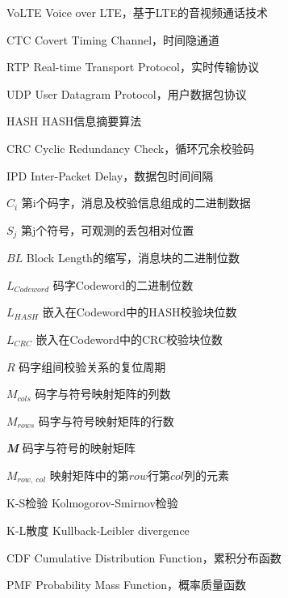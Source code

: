 \begin{denotation}
	
\item[VoLTE] Voice over LTE，基于LTE的音视频通话技术
\item[CTC] Covert Timing Channel，时间隐通道
\item[RTP] Real-time Transport Protocol，实时传输协议
\item[UDP] User Datagram Protocol，用户数据包协议
\item[HASH] HASH信息摘要算法
\item[CRC] Cyclic Redundancy Check，循环冗余校验码
\item[IPD] Inter-Packet Delay，数据包时间间隔
\item[] 
\item[$C_{i}$] 第i个码字，消息及校验信息组成的二进制数据
\item[$S_{j}$] 第j个符号，可观测的丢包相对位置
\item[$BL$] Block Length的缩写，消息块的二进制位数
\item[$L_{Codeword}$] 码字Codeword的二进制位数
\item[$L_{HASH}$] 嵌入在Codeword中的HASH校验块位数
\item[$L_{CRC}$] 嵌入在Codeword中的CRC校验块位数
\item[$R$] 码字组间校验关系的复位周期
\item[$M_{cols}$] 码字与符号映射矩阵的列数
\item[$M_{rows}$] 码字与符号映射矩阵的行数
\item[\textit{\textbf{M}}] 码字与符号的映射矩阵
\item[$M_{row,\ col}$] 映射矩阵中的第$row$行第$col$列的元素
\item[] 
\item[K-S检验] Kolmogorov-Smirnov检验
\item[K-L散度] Kullback-Leibler divergence
\item[CDF] Cumulative Distribution Function，累积分布函数
\item[PMF] Probability Mass Function，概率质量函数

\end{denotation}
